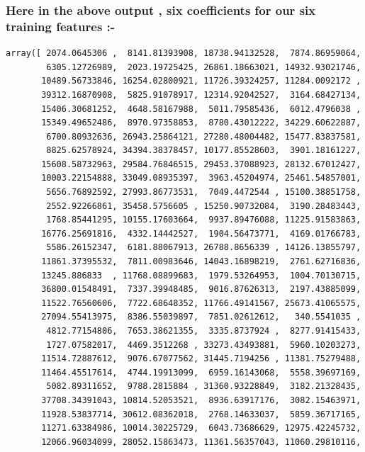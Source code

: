 \documentclass[11pt,a4paper]{report}
\makeatletter
\newcommand{\boxspacing}{\kern\kvtcb@left@rule\kern\kvtcb@boxsep}
\newcommand{\prompt}[4]{
        {\ttfamily\llap{{\color{#2}[#3]:\hspace{3pt}#4}}\vspace{-\baselineskip}}
    }
\makeatother
\begin{document}
\subsubsection*{Here in the above output , six coefficients for our six training features :-}
\newpage
            \begin{tcolorbox}[breakable, size=fbox, boxrule=.5pt, pad at break*=1mm, opacityfill=0]
\prompt{Out}{outcolor}{58}{\boxspacing}
\begin{Verbatim}[commandchars=\\\{\}]
array([ 2074.0645306 ,  8141.81393908, 18738.94132528,  7874.86959064,
        6305.12726989,  2023.19725425, 26861.18663021, 14932.93021746,
       10489.56733846, 16254.02800921, 11726.39324257, 11284.0092172 ,
       39312.16870908,  5825.91078917, 12314.92042527,  3164.68427134,
       15406.30681252,  4648.58167988,  5011.79585436,  6012.4796038 ,
       15349.49652486,  8970.97358853,  8780.43012222, 34229.60622887,
        6700.80932636, 26943.25864121, 27280.48004482, 15477.83837581,
        8825.62578924, 34394.38378457, 10177.85528603,  3901.18161227,
       15608.58732963, 29584.76846515, 29453.37088923, 28132.67012427,
       10003.22154888, 33049.08935397,  3963.45204974, 25461.54857001,
        5656.76892592, 27993.86773531,  7049.4472544 , 15100.38851758,
        2552.92266861, 35458.5756605 , 15250.90732084,  3190.28483443,
        1768.85441295, 10155.17603664,  9937.89476088, 11225.91583863,
       16776.25691816,  4332.14442527,  1904.56473771,  4169.01766783,
        5586.26152347,  6181.88067913, 26788.8656339 , 14126.13855797,
       11861.37395532,  7811.00983646, 14043.16898219,  2761.62716836,
       13245.886833  , 11768.08899683,  1979.53264953,  1004.70130715,
       36800.01548491,  7337.39948485,  9016.87626313,  2197.43885099,
       11522.76560606,  7722.68648352, 11766.49141567, 25673.41065575,
       27094.55413975,  8386.55039897,  7851.02612612,   340.5541035 ,
        4812.77154806,  7653.38621355,  3335.8737924 ,  8277.91415433,
        1727.07582017,  4469.3512268 , 33273.43493881,  5960.10203273,
       11514.72887612,  9076.67077562, 31445.7194256 , 11381.75279488,
       11464.45517614,  4744.19913099,  6959.16143068,  5558.39697169,
        5082.89311652,  9788.2815884 , 31360.93228849,  3182.21328435,
       37708.34391043, 10814.52053521,  8936.63917176,  3082.15463971,
       11928.53837714, 30612.08362018,  2768.14633037,  5859.36717165,
       11271.63384986, 10014.30225729,  6043.73686629, 12975.42245732,
       12066.96034099, 28052.15863473, 11361.56357043, 11060.29810116,

\end{Verbatim}
\end{tcolorbox}
\end{document}
